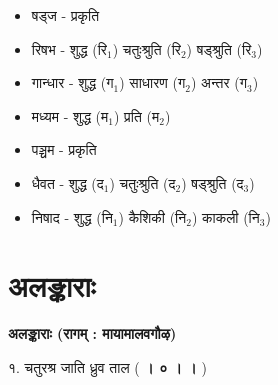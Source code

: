 \documentclass[12pt]{article}
\begin{document}
\begin{sanskrit}
\begin{itemize}
 \item षड्ज - प्रकृति
 \item रिषभ - शुद्ध (रि$_{1}$) \hspace{40pt} चतुःश्रुति (रि$_{2}$) \hspace{40pt} षड्श्रुति (रि$_{3}$)
 \item गान्धार - शुद्ध (ग$_{1}$) \hspace{40pt} साधारण (ग$_{2}$) \hspace{40pt} अन्तर (ग$_{3}$)
 \item मध्यम - शुद्ध (म$_{1}$) \hspace{40pt} प्रति (म$_{2}$)
 \item पञ्चम - प्रकृति
 \item धैवत - शुद्ध (द$_{1}$) \hspace{40pt} चतुःश्रुति (द$_{2}$) \hspace{40pt} षड्श्रुति (द$_{3}$)
 \item निषाद - शुद्ध (नि$_{1}$) \hspace{40pt} कैशिकी (नि$_{2}$) \hspace{40pt} काकली (नि$_{3}$)
\end{itemize}
\newpage


\section{अलङ्काराः}

\begin{center}
 \textbf{अलङ्काराः (रागम् : मायामालवगौऴ)}
\end{center}

\begin{center}
 १. चतुरश्र जाति ध्रुव ताल (\textbf{ । ० । । })
\end{center}


\end{sanskrit}
\end{document}
